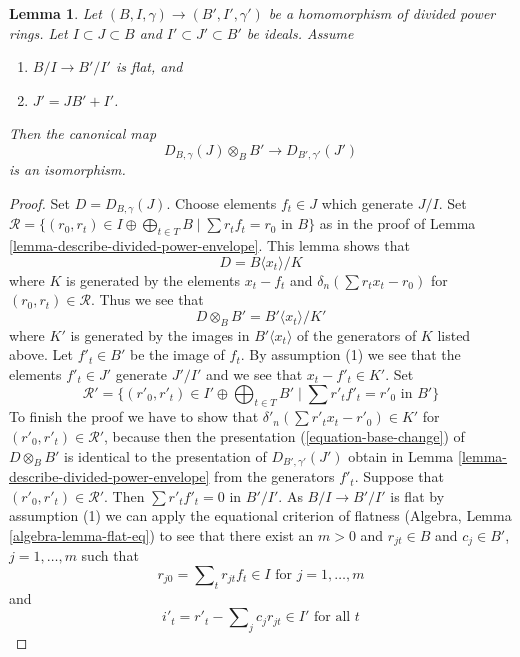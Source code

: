 \documentclass[10pt,a4paper]{amsart}
\theoremstyle{plain}
\newtheorem{lemma}[subsection]{Lemma}
\theoremstyle{definition}
\theoremstyle{remark}
\numberwithin{equation}{subsection}
\begin{document}
\begin{lemma}
\label{lemma-flat-extension-divided-power-envelope}
Let $(B, I, \gamma) \to (B', I', \gamma')$ be a homomorphism of
divided power rings. Let $I \subset J \subset B$ and
$I' \subset J' \subset B'$ be ideals. Assume
\begin{enumerate}
\item $B/I \to B'/I'$ is flat, and
\item $J' = JB' + I'$.
\end{enumerate}
Then the canonical map
$$
D_{B, \gamma}(J) \otimes_B B' \longrightarrow D_{B', \gamma'}(J')
$$
is an isomorphism.
\end{lemma}

\begin{proof}
Set $D = D_{B, \gamma}(J)$. Choose elements $f_t \in J$ which generate $J/I$.
Set $\mathcal{R} = \{(r_0, r_t) \in I \oplus \bigoplus\nolimits_{t \in T} B
\mid \sum r_t f_t = r_0 \text{ in }B\}$ as in the proof of
Lemma \ref{lemma-describe-divided-power-envelope}. This lemma shows that
$$
D = B\langle x_t \rangle/ K
$$
where $K$ is generated by the elements $x_t - f_t$ and
$\delta_n(\sum r_t x_t - r_0)$ for $(r_0, r_t) \in \mathcal{R}$.
Thus we see that
\begin{equation}
\label{equation-base-change}
D \otimes_B B' = B'\langle x_t \rangle/K'
\end{equation}
where $K'$ is generated by the images in $B'\langle x_t \rangle$
of the generators of $K$ listed above. Let $f'_t \in B'$ be the image
of $f_t$. By assumption (1) we see that the elements $f'_t \in J'$
generate $J'/I'$ and we see that $x_t - f'_t \in K'$. Set
$$
\mathcal{R}' =
\{(r'_0, r'_t) \in I' \oplus \bigoplus\nolimits_{t \in T} B'
\mid \sum r'_t f'_t = r'_0 \text{ in }B'\}
$$
To finish the proof we have to show that
$\delta'_n(\sum r'_t x_t - r'_0) \in K'$ for
$(r'_0, r'_t) \in \mathcal{R}'$, because then the presentation
(\ref{equation-base-change}) of $D \otimes_B B'$ is identical
to the presentation of $D_{B', \gamma'}(J')$ obtain in
Lemma \ref{lemma-describe-divided-power-envelope} from the generators $f'_t$.
Suppose that $(r'_0, r'_t) \in \mathcal{R}'$. Then
$\sum r'_t f'_t = 0$ in $B'/I'$. As $B/I \to B'/I'$ is flat by
assumption (1) we can apply the equational criterion of flatness
(Algebra, Lemma \ref{algebra-lemma-flat-eq}) to see
that there exist an $m > 0$ and
$r_{jt} \in B$ and $c_j \in B'$, $j = 1, \ldots, m$ such
that
$$
r_{j0} = \sum\nolimits_t r_{jt} f_t  \in I \text{ for } j = 1, \ldots, m
$$
and
$$
i'_t  = r'_t - \sum\nolimits_j c_j r_{jt} \in I' \text{ for all }t
$$
\end{proof}
\end{document}
